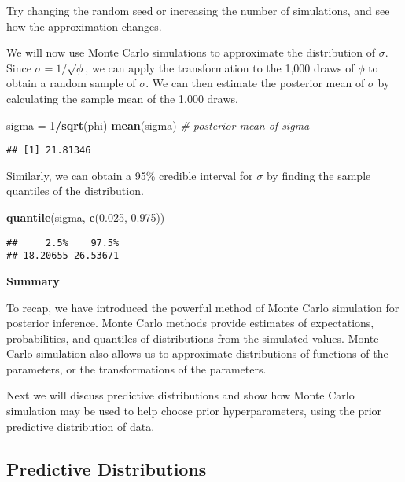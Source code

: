 \documentclass[]{book}
\newenvironment{Shaded}{\begin{snugshade}}{\end{snugshade}}
\newcommand{\KeywordTok}[1]{\textcolor[rgb]{0.13,0.29,0.53}{\textbf{#1}}}
\newcommand{\DecValTok}[1]{\textcolor[rgb]{0.00,0.00,0.81}{#1}}
\newcommand{\FloatTok}[1]{\textcolor[rgb]{0.00,0.00,0.81}{#1}}
\newcommand{\StringTok}[1]{\textcolor[rgb]{0.31,0.60,0.02}{#1}}
\newcommand{\CommentTok}[1]{\textcolor[rgb]{0.56,0.35,0.01}{\textit{#1}}}
\newcommand{\OperatorTok}[1]{\textcolor[rgb]{0.81,0.36,0.00}{\textbf{#1}}}
\newcommand{\NormalTok}[1]{#1}
\theoremstyle{definition}
\theoremstyle{definition}
\theoremstyle{definition}
\theoremstyle{remark}
\begin{document}
Try changing the random seed or increasing the number of simulations,
and see how the approximation changes.

We will now use Monte Carlo simulations to approximate the distribution
of \(\sigma\). Since \(\sigma = 1/\sqrt{\phi}\), we can apply the
transformation to the 1,000 draws of \(\phi\) to obtain a random sample
of \(\sigma\). We can then estimate the posterior mean of \(\sigma\) by
calculating the sample mean of the 1,000 draws.

\begin{Shaded}
\begin{Highlighting}[]
\NormalTok{sigma =}\StringTok{ }\DecValTok{1}\OperatorTok{/}\KeywordTok{sqrt}\NormalTok{(phi)}
\KeywordTok{mean}\NormalTok{(sigma) }\CommentTok{# posterior mean of sigma}
\end{Highlighting}
\end{Shaded}

\begin{verbatim}
## [1] 21.81346
\end{verbatim}

Similarly, we can obtain a 95\% credible interval for \(\sigma\) by
finding the sample quantiles of the distribution.

\begin{Shaded}
\begin{Highlighting}[]
\KeywordTok{quantile}\NormalTok{(sigma, }\KeywordTok{c}\NormalTok{(}\FloatTok{0.025}\NormalTok{, }\FloatTok{0.975}\NormalTok{))}
\end{Highlighting}
\end{Shaded}

\begin{verbatim}
##     2.5%    97.5% 
## 18.20655 26.53671
\end{verbatim}

\textbf{Summary}

To recap, we have introduced the powerful method of Monte Carlo
simulation for posterior inference. Monte Carlo methods provide
estimates of expectations, probabilities, and quantiles of distributions
from the simulated values. Monte Carlo simulation also allows us to
approximate distributions of functions of the parameters, or the
transformations of the parameters.

Next we will discuss predictive distributions and show how Monte Carlo
simulation may be used to help choose prior hyperparameters, using the
prior predictive distribution of data.

\subsection{Predictive Distributions}\label{sec:NG-predictive}
\end{document}
